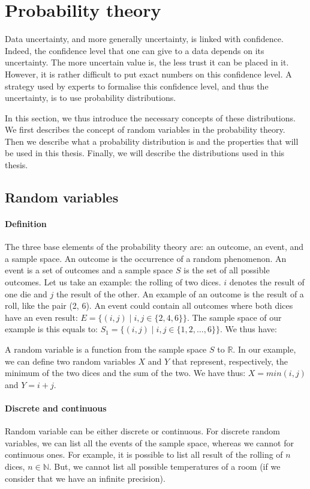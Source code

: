 \section{Probability theory}

Data uncertainty, and more generally uncertainty, is linked with confidence.
Indeed, the confidence level that one can give to a data depends on its uncertainty.
The more uncertain value is, the less trust it can be placed in it.
However, it is rather difficult to put exact numbers on this confidence level.
A strategy used by experts to formalise this confidence level, and thus the uncertainty, is to use probability distributions.

In this section, we thus introduce the necessary concepts of these distributions.
We first describes the concept of random variables in the probability theory.
Then we describe what a probability distribution is and the properties that will be used in this thesis.
Finally, we will describe the distributions used in this thesis.

\subsection{Random variables}

\paragraph{Definition}
The three base elements of the probability theory are: an outcome, an event, and a sample space.
An outcome is the occurrence of a random phenomenon.
An event is a set of outcomes and a sample space $S$ is the set of all possible outcomes.
Let us take an example: the rolling of two dices.
$i$ denotes the result of one die and $j$ the result of the other.
An example of an outcome is the result of a roll, like the pair (2, 6).
An event could contain all outcomes where both dices have an even result: $E = \{ (i,j) \mid i,j \in \{2, 4, 6\}\}$.
The sample space of our example is this equals to: $S_1 = \{ (i,j) \mid i,j \in \{1, 2, \dots , 6\} \}$.
We thus have: 

A random variable is a function from the sample space $S$ to $\mathds{R}$.
In our example, we can define two random variables $X$ and $Y$ that represent, respectively, the minimum of the two dices and the sum of the two.
We have thus: $X= min(i, j)$ and $Y= i + j$.

\paragraph{Discrete and continuous}
Random variable can be either discrete or continuous.
For discrete random variables, we can list all the events of the sample space, whereas we cannot for continuous ones.
For example, it is possible to list all result of the rolling of $n$ dices, $n \in \mathds{N}$.
But, we cannot list all possible temperatures of a room (if we consider that we have an infinite precision).

